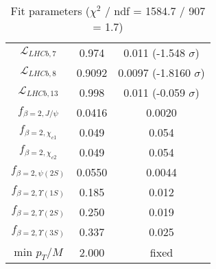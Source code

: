 \begin{table}[h!]
\begin{tabular}{c|c|c}
$\mathcal L_{LHCb,7}$ & 0.974 & 0.011 (-1.548 $\sigma$) \\
$\mathcal L_{LHCb,8}$ & 0.9092 & 0.0097 (-1.8160 $\sigma$) \\
$\mathcal L_{LHCb,13}$ & 0.998 & 0.011 (-0.059 $\sigma$) \\
$f_{\beta=2,J/\psi}$ & 0.0416 & 0.0020 \\
$f_{\beta=2,\chi_{c1}}$ & 0.049 & 0.054 \\
$f_{\beta=2,\chi_{c2}}$ & 0.049 & 0.054 \\
$f_{\beta=2,\psi(2S)}$ & 0.0550 & 0.0044 \\
$f_{\beta=2,\Upsilon(1S)}$ & 0.185 & 0.012 \\
$f_{\beta=2,\Upsilon(2S)}$ & 0.250 & 0.019 \\
$f_{\beta=2,\Upsilon(3S)}$ & 0.337 & 0.025 \\
min $p_T/M$ & 2.000 & fixed \\
\end{tabular}
\caption{Fit parameters ($\chi^2$ / ndf = 1584.7 / 907 = 1.7)}
\end{table}
